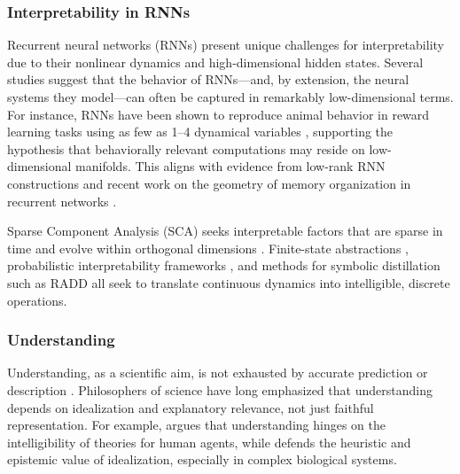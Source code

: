 \documentclass{article}
\theoremstyle{definition} \newtheorem{definition}{Definition}  \newtheorem{example}{Example}
\theoremstyle{remark} \newtheorem{remark}{Remark}
\newcounter{ct}
\begin{document}
\subsubsection{Interpretability in RNNs}
Recurrent neural networks (RNNs) present unique challenges for interpretability due to their nonlinear dynamics and high-dimensional hidden states\citep{he2024multilevel}.
%
Several studies suggest that the behavior of RNNs—and, by extension, the neural systems they model—can often be captured in remarkably low-dimensional terms.
For instance, RNNs have been shown to reproduce animal behavior in reward learning tasks using as few as 1–4 dynamical variables \citep{jian2023tinyrnn}, supporting the hypothesis that behaviorally relevant computations may reside on low-dimensional manifolds\citep{turner2023simplicity}.
This aligns with evidence from low-rank RNN constructions \citep{beiran2021shaping, valente2022extracting, valente2022probing} and recent work on the geometry of memory organization in recurrent networks \citep{haputhanthri2025understanding}.


Sparse Component Analysis (SCA) seeks interpretable factors that are sparse in time and evolve within orthogonal dimensions  \citep{zimnik2024identifying}.
%
Finite-state abstractions \citep{oliva2019fsm, cotteret2024fsm}, probabilistic interpretability frameworks \citep{dong2020towards}, and methods for symbolic distillation such as RADD \citep{schaeffer2020reverseengineering} all seek to translate continuous dynamics into intelligible, discrete operations.




\subsubsection{Understanding}\label{sec:understanding}
Understanding, as a scientific aim, is not exhausted by accurate prediction or description \citep{chirimuuta2021prediction}.
Philosophers of science have long emphasized that understanding depends on idealization and explanatory relevance, not just faithful representation.
For example, \citet{deregt2017understanding} argues that understanding hinges on the intelligibility of theories for human agents, while  \citet{potochnik2017idealization,potochnik2020idealization,potochnik2021levels} defends the heuristic and epistemic value of idealization, especially in complex biological systems.
\end{document}
